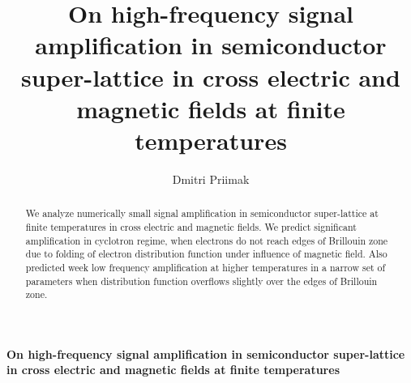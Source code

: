 \documentclass[40pt,letterpaper,physrev]{article}
\author{Dmitri Priimak}
\title{On high-frequency signal amplification in semiconductor super-lattice in cross electric and magnetic fields 
at finite temperatures}
\begin{document}

\newcommand{\ddx}[2] {
	\frac{\text{d}#1}{\text{d}#2}
}
\newcommand{\ddt}[1] {
	\frac{\text{d}#1}{\text{d}t}
}
\newcommand{\dtwodt}[1] {
	\frac{\text{d}^{2}#1}{\text{d}t^{2}}
}
 \begin{center}
  {\bf On high-frequency signal amplification in semiconductor super-lattice in cross electric and magnetic fields 
at finite temperatures}
 \end{center}
  \begin{abstract}
  We analyze numerically small signal amplification in semiconductor super-lattice at finite temperatures in cross
electric and magnetic fields. We predict significant amplification in cyclotron regime, when electrons do not reach
edges of Brillouin zone due to folding of electron distribution function under influence of magnetic field. Also
predicted week low frequency amplification at higher temperatures in a narrow set of parameters when distribution
function overflows slightly over the edges of Brillouin zone.
  \end{abstract}
\end{document}

